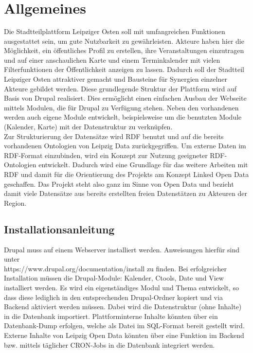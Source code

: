 \documentclass{swp}
\begin{document}
\\\\\\\\\\

\tableofcontents
\section{Allgemeines}
Die Stadtteilplattform Leipziger Osten soll mit umfangreichen Funktionen ausgestattet sein, um gute Nutzbarkeit zu gew\"ahrleisten. Akteure haben hier die M\"oglichkeit, ein \"offentliches Profil zu erstellen, ihre Veranstaltungen einzutragen und auf einer anschaulichen Karte und einem Terminkalender mit vielen Filterfunktionen der \"Offentlichkeit anzeigen zu lassen. Dadurch soll der Stadtteil Leipziger Osten attraktiver gemacht und Bausteine f\"ur Synergien einzelner Akteure gebildet werden. Diese grundlegende Struktur der Plattform wird auf Basis von Drupal realisiert. Dies erm\"oglicht einen einfachen Ausbau der Webseite mittels Modulen, die f\"ur Drupal zu Verf\"ugung stehen. Neben den vorhandenen werden auch eigene Module entwickelt, beispielsweise um die benutzten Module (Kalender, Karte) mit der Datenstruktur zu verkn\"upfen.\\
Zur Strukturierung der Datens\"atze wird RDF benutzt und auf die bereits vorhandenen Ontologien von Leipzig Data zur\"uckgegriffen. Um externe Daten im RDF-Format einzubinden, wird ein Konzept zur Nutzung geeigneter RDF-Ontologien entwickelt. Dadurch wird eine Grundlage f\"ur das weitere Arbeiten mit RDF und damit f\"ur die Orientierung des Projekts am Konzept Linked Open Data geschaffen. Das Projekt steht also ganz im Sinne von Open Data und bezieht damit viele Datens\"atze aus bereits erstellten freien Datenst\"atzen zu Akteuren der Region.
\subsection{Installationsanleitung}
Drupal muss auf einem Webserver installiert werden. Anweisungen hierf\"ur sind unter \\https://www.drupal.org/documentation/install zu finden. Bei erfolgreicher Installation m\"ussen die Drupal-Module: Kalender, Ctools, Date und View installiert werden. Es wird ein eigenst\"andiges Modul und Thema entwickelt, so dass diese lediglich in den entsprechenden Drupal-Ordner kopiert und via Backend aktiviert werden m\"ussen. Dabei wird die Datenstruktur (ohne Inhalte) in die Datenbank importiert. Plattforminterne Inhalte k\"onnten \"uber ein Datenbank-Dump erfolgen, welche als Datei im SQL-Format bereit gestellt wird. Externe Inhalte von Leipzig Open Data k\"onnten \"uber eine Funktion im Backend bzw. mittels t\"aglicher CRON-Jobs in die Datenbank integriert werden.
\end{document}

